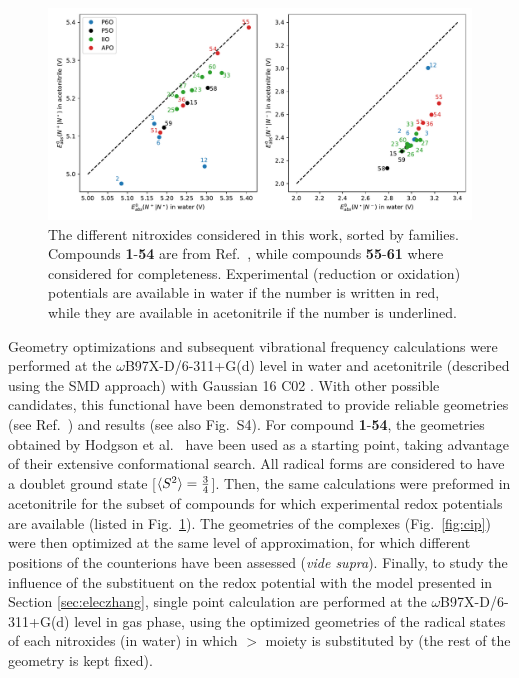 \documentclass[review,preprint]{elsarticle}
\begin{document}
\begin{figure}[!p]
\centering
\includegraphics[width=\linewidth]{Figure7}
\caption{The different nitroxides considered in this work, sorted by families. Compounds \textbf{1}-\textbf{54} are from Ref.~, while compounds \textbf{55}-\textbf{61} where considered for completeness. Experimental (reduction or oxidation) potentials are available in water if the number is written in red, while they are available in acetonitrile if the number is underlined.}
\label{fig:nitroxides}
\end{figure}

Geometry optimizations and subsequent vibrational frequency calculations were performed at the $\omega$B97X-D/6-311+G(d) level in water and acetonitrile (described using the SMD \cite{marenichUniversalSolvationModel2009} approach) with Gaussian 16 C02 \cite{g16}. With other possible candidates, this functional have been demonstrated to  provide reliable geometries (see Ref.~) and results  \cite{flores-leonarFurtherInsightsDFT2017,maierG4AccuracyDFT2020} (see also Fig.~S4).  For compound \textbf{1}-\textbf{54}, the geometries obtained by Hodgson et al.~\cite{hodgsonOneElectronOxidationReduction2007} have been used as a starting point, taking advantage of their extensive conformational search. All radical forms are considered to have a doublet ground state  [$\braket{S^2}=\frac{3}{4}$]. Then, the same calculations were preformed in acetonitrile for the subset of compounds for which experimental redox potentials are available (listed in Fig.~\ref{fig:nitroxides}). The geometries of the complexes (Fig.~\ref{fig:cip}) were then optimized at the same level of approximation, for which different positions of the counterions have been assessed (\textit{vide supra}). Finally, to study the influence of the substituent on the redox potential with the model presented in Section \ref{sec:eleczhang}, single point calculation are performed at the $\omega$B97X-D/6-311+G(d) level in gas phase, using the optimized geometries of  the radical states of each nitroxides (in water) in which $>$ moiety is substituted by  (the rest of the geometry is kept fixed).
\end{document}
